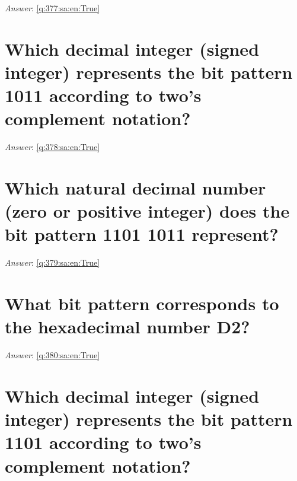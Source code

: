 \documentclass[a4paper,11pt,oneside]{book}
\begin{document}
\begin{sloppypar}
\textit{Answer}: \autoref{q:377:sa:en:True}



\section{Which decimal integer (signed integer) represents the bit pattern 1011 according to two{\textquoteright}s complement notation?}

\label{q:378:sa:en:False}

\vspace{2cm}

\noindent\makebox[\textwidth]{\hrulefill}

\vspace{1cm}

\textit{Answer}: \autoref{q:378:sa:en:True}



\section{Which natural decimal number (zero or positive integer) does the bit pattern 1101 1011 represent?}

\label{q:379:sa:en:False}

\vspace{2cm}

\noindent\makebox[\textwidth]{\hrulefill}

\vspace{1cm}

\textit{Answer}: \autoref{q:379:sa:en:True}



\section{What bit pattern corresponds to the hexadecimal number D2?}

\label{q:380:sa:en:False}

\vspace{2cm}

\noindent\makebox[\textwidth]{\hrulefill}

\vspace{1cm}

\textit{Answer}: \autoref{q:380:sa:en:True}



\section{Which decimal integer (signed integer) represents the bit pattern 1101 according to two{\textquoteright}s complement notation?}


\end{sloppypar}
\end{document}
